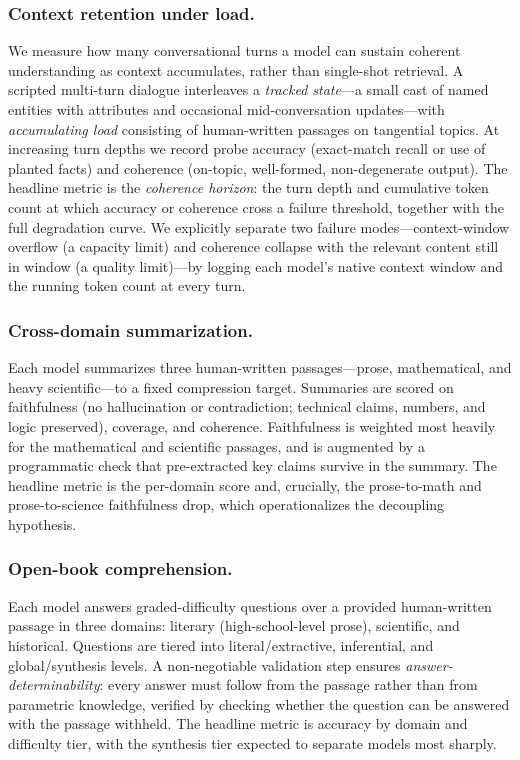 \documentclass[runningheads]{llncs}
\begin{document}
\subsubsection{Context retention under load.}
We measure how many conversational turns a model can sustain coherent
understanding as context accumulates, rather than single-shot retrieval. A
scripted multi-turn dialogue interleaves a \emph{tracked state}---a small cast of
named entities with attributes and occasional mid-conversation updates---with
\emph{accumulating load} consisting of human-written passages on tangential
topics. At increasing turn depths we record probe accuracy (exact-match recall
or use of planted facts) and coherence (on-topic, well-formed, non-degenerate
output). The headline metric is the \emph{coherence horizon}: the turn depth and
cumulative token count at which accuracy or coherence cross a failure threshold,
together with the full degradation curve. We explicitly separate two failure
modes---context-window overflow (a capacity limit) and coherence collapse with
the relevant content still in window (a quality limit)---by logging each model's
native context window and the running token count at every turn.

\subsubsection{Cross-domain summarization.}
Each model summarizes three human-written passages---prose, mathematical, and
heavy scientific---to a fixed compression target. Summaries are scored on
faithfulness (no hallucination or contradiction; technical claims, numbers, and
logic preserved), coverage, and coherence. Faithfulness is weighted most heavily
for the mathematical and scientific passages, and is augmented by a programmatic
check that pre-extracted key claims survive in the summary. The headline metric
is the per-domain score and, crucially, the prose-to-math and prose-to-science
faithfulness drop, which operationalizes the decoupling hypothesis.

\subsubsection{Open-book comprehension.}
Each model answers graded-difficulty questions over a provided human-written
passage in three domains: literary (high-school-level prose), scientific, and
historical. Questions are tiered into literal/extractive, inferential, and
global/synthesis levels. A non-negotiable validation step ensures
\emph{answer-determinability}: every answer must follow from the passage rather
than from parametric knowledge, verified by checking whether the question can be
answered with the passage withheld. The headline metric is accuracy by domain
and difficulty tier, with the synthesis tier expected to separate models most
sharply.
\end{document}
